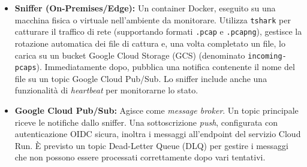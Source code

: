 \documentclass[11pt, a4paper]{article}
\begin{document}
\begin{itemize}[leftmargin=*, label=\textbullet]
    \item \textbf{Sniffer (On-Premises/Edge):} Un container Docker, eseguito su una macchina fisica o virtuale nell'ambiente da monitorare. Utilizza \texttt{tshark} per catturare il traffico di rete (supportando formati \texttt{.pcap} e \texttt{.pcapng}), gestisce la rotazione automatica dei file di cattura e, una volta completato un file, lo carica su un bucket Google Cloud Storage (GCS) (denominato \texttt{incoming-pcaps}). Immediatamente dopo, pubblica una notifica contenente il nome del file su un topic Google Cloud Pub/Sub. Lo sniffer include anche una funzionalità di \textit{heartbeat} per monitorarne lo stato.

    \item \textbf{Google Cloud Pub/Sub:} Agisce come \textit{message broker}. Un topic principale riceve le notifiche dallo sniffer. Una sottoscrizione \textit{push}, configurata con autenticazione OIDC sicura, inoltra i messaggi all'endpoint del servizio Cloud Run. È previsto un topic Dead-Letter Queue (DLQ) per gestire i messaggi che non possono essere processati correttamente dopo vari tentativi.


\end{itemize}
\end{document}
